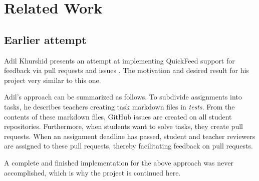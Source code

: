 
\chapter{Related Work}
\label{ch:related}

\section{Earlier attempt}

Adil Khurshid presents an attempt at implementing QuickFeed support for feedback via pull requests and issues \cite{adil}.
The motivation and desired result for his project very similar to this one.

Adil's approach can be summarized as follows.
To subdivide assignments into tasks, he describes teachers creating task markdown files in \textit{tests}.
From the contents of these markdown files, GitHub issues are created on all student repositories.
Furthermore, when students want to solve tasks, they create pull requests.
When an assignment deadline has passed, student and teacher reviewers are assigned to these pull requests, thereby facilitating feedback on pull requests.

A complete and finished implementation for the above approach was never accomplished, which is why the project is continued here.